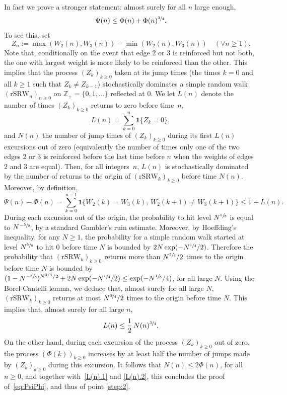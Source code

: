 \documentclass[10pt]{amsart}
\let \nicefrac\sfrac
\numberwithin{equation}{section}
\theoremstyle{definition}
\let\bs\boldsymbol
\begin{document}
In fact we prove a stronger statement: almost surely for all $n$ large enough,
\begin{equation}\label{eq:PsiPhi}
\Psi(n) \le \Phi(n) + \Phi(n)^{\nicefrac34}.
\end{equation}
To see this, set
\[
Z_n := \max(W_2(n) , W_3(n)) - \min(W_2(n),W_3(n))\quad (\forall n\geq 1).
\]
Note that, conditionally on the event that edge $2$ or $3$ is reinforced but not both,
the one with largest weight is more likely to be reinforced than the other.
This implies that the process $(Z_k)_{k\ge 0}$ taken at its jump times (\ie the times $k=0$ and all $k\geq 1$ such that $Z_k\neq Z_{k-1}$)
stochastically dominates a simple random walk $(\mathrm{rSRW}_n)_{n\geq 0}$
on $\mathbb Z_+=\{0,1,\dots\}$ reflected at $0$.
We let $L(n)$ denote the number of times $(Z_k)_{k\ge 0}$ returns to zero before time~$n$, \ie
\[
L(n) = \sum_{k=0}^n \bs 1\{Z_k = 0\},
\]
and $N(n)$ the number of jump times of $(Z_k)_{k\ge 0}$ during its first $L(n)$ excursions out of zero
(equivalently the number of times only one of the two edges $2$ or $3$ is reinforced before the last time before $n$ when the weights of edges $2$ and $3$ are equal).
Then, for all integers~$n$, $L(n)$ is stochastically dominated by the number of returns to the origin of $(\mathrm{rSRW}_k)_{k\geq 0}$ before time $N(n)$.
Moreover, by definition,
\begin{equation}\label{L(n).1}
\Psi(n) - \Phi(n) = \sum_{k=0}^{n-1} \bs 1\{W_2(k) = W_3(k), \, W_2(k+1)\neq W_3(k+1)\} \le 1+ L(n).
\end{equation}
During each excursion out of the origin,
the probability to hit level $N^{\nicefrac58}$ is equal to $N^{-\nicefrac58}$, by a standard Gambler's ruin estimate. Moreover, by Hoeffding's inequality, for any $N\ge 1$,
the probability for a simple random walk started at level $N^{\nicefrac58}$ to hit $0$ before time $N$ is bounded by $2N\exp(-N^{\nicefrac14}/2)$.
Therefore the probability that
$(\mathrm{rSRW}_k)_{k\geq 0}$ returns more than $N^{\nicefrac34}/2$ times to the origin before time $N$ is bounded by $(1-N^{-\nicefrac58})^{N^{3/4}/2}+2N\exp(-N^{\nicefrac14}/2) \le \exp(-N^{\nicefrac18}/4)$, for all large $N$.
Using {the} Borel-Cantelli lemma, we deduce that, almost surely for all large $N$, $(\mathrm{rSRW}_k)_{k\geq 0}$ returns at most $N^{\nicefrac34}/2$ times to the origin before time $N$.
This implies that,
almost surely for all large $n$,
\begin{equation}\label{L(n).2}
L(n) \le \frac12\, N(n)^{\nicefrac 34}.
\end{equation}
On the other hand, during each excursion of the process $(Z_k)_{k\ge 0}$ out of zero, the process $(\Phi(k))_{k\ge 0}$ increases by at least half the number of jumps made by $(Z_k)_{k\ge 0}$ during this excursion. It follows that $N(n)\le 2\Phi(n)$, for all $n\ge 0$, and together with~\eqref{L(n).1} and \eqref{L(n).2}, this concludes the proof of~\eqref{eq:PsiPhi}, and thus of point \eqref{step:2}.
\end{document}
